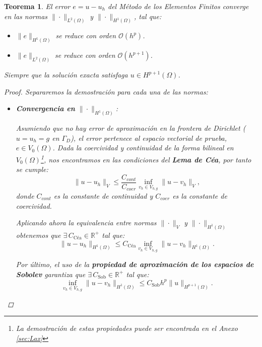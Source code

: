 \documentclass[11pt]{book}
\theoremstyle{plain} %
\newtheorem{teorema}{Teorema}[chapter]
\theoremstyle{definition} %
\theoremstyle{definition} %
\begin{document}
    
\begin{teorema}\label{teor:FEM_cotas}
    El error $e=u-u_h$ del Método de los Elementos Finitos converge en las normas $\|\cdot\|_{L^2(\Omega)}$ y $\|\cdot\|_{H^1(\Omega)}$, tal que:
    \begin{itemize}
        \item $\|e\|_{H^1(\Omega)}$ se reduce con orden $\mathcal{O}(h^{p})$.
        \item $\|e\|_{L^2(\Omega)}$ se reduce con orden $\mathcal{O}(h^{p+1})$.
    \end{itemize}
    Siempre que la solución exacta satisfaga $u\in H^{p+1}(\Omega)$.

    \begin{proof}
        Separaremos la demostración para cada una de las normas:
    \begin{itemize}
    \item \textbf{Convergencia en } $\|\cdot\|_{H^1(\Omega)}$:
    \label{anexo:H1_general}

    Asumiendo que no hay error de aproximación en la frontera de Dirichlet ($u = u_h = g$ en $\Gamma_D$), el error pertenece al espacio vectorial de prueba, $e \in V_0(\Omega)$. Dada la coercividad y continuidad de la forma bilineal en $V_0(\Omega)$\footnote{La demostración de estas propiedades puede ser encontrada en el Anexo \ref{sec:Lax}}, nos encontramos en las condiciones del \textbf{Lema de Céa}, por tanto se cumple:
    \begin{equation*}
        \|u - u_h\|_V \leq \frac{C_{cont}}{C_{coer}} \inf_{v_h \in V_{h,g}} \|u - v_h\|_V, 
    \end{equation*}
    donde $C_{cont}$ es la constante de continuidad y $C_{coer}$ es la constante de coercividad.

    Aplicando ahora la equivalencia entre normas $\| \cdot \|_V$ y $\| \cdot \|_{H^1(\Omega)}$ obtenemos que $\exists \, C_{\text{Céa}} \in \mathbb{R}^+$ tal que:
    \begin{equation}
        \label{eq:cea_anexo}
        \|u - u_h\|_{H^1(\Omega)} \leq C_{\text{Céa}} \inf_{v_h \in V_{h,g}} \|u - v_h\|_{H^1(\Omega)}.
    \end{equation}

    Por último, el uso de la \textbf{propiedad de aproximación de los espacios de Sobolev} garantiza que $\exists \, C_{\text{Sob}} \in \mathbb{R}^+$ tal que:
    \begin{equation}
        \label{eq:sob_anexo}
        \inf_{v_h \in V_{h,g}} \|u - v_h\|_{H^1(\Omega)} \leq C_{\text{Sob}} h^{p} \|u\|_{H^{p+1}(\Omega)}.
    \end{equation}


\end{itemize}
\end{proof}
\end{teorema}
\end{document}
